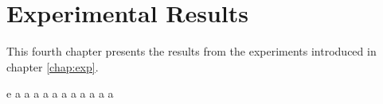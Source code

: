 \chapter{Experimental Results}
\label{chap:results}

This fourth chapter presents the results from the experiments introduced in chapter \ref{chap:exp}. 






e \cite{projthesis}
a \cite{claerbout1991scrutiny}
a \cite{landes1951scrutiny}
a \cite{omar2013machine}
a \cite{wei2022lstmautoencoder}
a \cite{julia}
a \cite{apSensing2019railwaydas}
a \cite{DBLP:journals/corr/SrivastavaMS15}
a \cite{2011ndongsigprocandet}
a \cite{doi:10.1137/141000671}
a \cite{bioengineering10040405}
a \cite{maulik2020recurrent}





